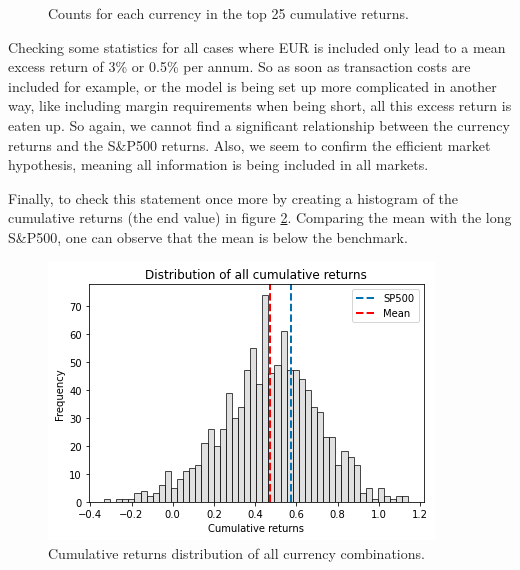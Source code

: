 \newpage

\begin{figure}[h]
  \centering
  \caption{Counts for each currency in the top 25 cumulative returns.}
  \label{fig: combination_counts}
\end{figure}

\noindent Checking some statistics for all cases where EUR is included only lead to a mean excess return of 3\% or 0.5\% per annum. So as soon as transaction costs are included for example, or the model is being set up more complicated in another way, like including margin requirements when being short, all this excess return is eaten up. So again, we cannot find a significant relationship between the currency returns and the S\&P500 returns. Also, we seem to confirm the efficient market hypothesis, meaning all information is being included in all markets.

\noindent Finally, to check this statement once more by creating a histogram of the cumulative returns (the end value) in figure \ref{fig: cumreturns histogram}. Comparing the mean with the long S\&P500, one can observe that the mean is below the benchmark.

\begin{figure}[H]
\begin{center}
  \includegraphics[width=\textwidth]{images/hist_comparison.png}
  \end{center}
  \caption{Cumulative returns distribution of all currency combinations.}
  \label{fig: cumreturns histogram}
\end{figure}


